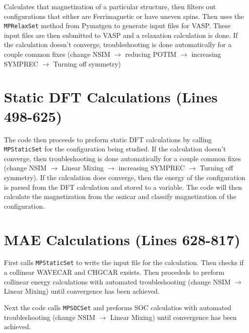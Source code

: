 \documentclass[12pt]{article}
\newcommand{\pmint}[1]{\texttt{#1}}
\begin{document}
Calculates that magnetization of a particular structure, then filters out configurations that either are Ferrimagnetic or have uneven spins. Then uses the \pmint{MPRelaxSet} method from Pymatgen to generate input files for VASP. These input files are then submitted to VASP and a relaxation calculation is done. If the calculation doesn't converge, troubleshooting is done automatically for a couple common fixes (change NSIM $\rightarrow$ reducing POTIM $\rightarrow$ increasing  SYMPREC $\rightarrow$ Turning off symmetry)

\section*{Static DFT Calculations (Lines 498-625)} %
The code then proceeds to preform static DFT calculations by calling \pmint{MPStaticSet} for the configuration being studied. If the calculation doesn't converge, then troubleshooting is done automatically for a couple common fixes (change NSIM $\rightarrow$ Linear Mixing $\rightarrow$ increasing  SYMPREC $\rightarrow$ Turning off symmetry). If the calculation does converge, then the energy of the configuration is parsed from the DFT calculation and stored to a variable. The code will then calculate the magnetization from the oszicar and classify magnetization of the configuration. 

\section*{MAE Calculations (Lines 628-817) } %
First calls \pmint{MPStaticSet} to write the input file for the calculation. Then checks if a collinear WAVECAR and CHGCAR exsists. Then procededs to preform collinear energy calculations with automated troubleshooting (change NSIM $\rightarrow$ Linear Mixing) until convergence has been achieved. 

Next the code calls \pmint{MPSOCSet} and preforms SOC calculatios with automated troubleshooting (change NSIM $\rightarrow$ Linear Mixing) until convergence has been achieved. 

\end{document}
